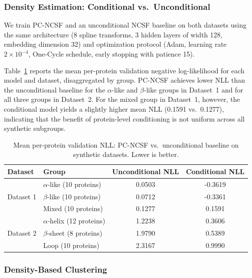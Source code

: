 \documentclass{article}
\begin{document}
\subsubsection{Density Estimation: Conditional vs.\ Unconditional}
\label{sec:sim_nll}

We train PC-NCSF and an unconditional NCSF baseline on both datasets
using the same architecture (8 spline transforms, 3 hidden layers of width 128,
embedding dimension 32) and optimization protocol (Adam, learning rate
$2 \times 10^{-4}$, One-Cycle schedule, early stopping with patience 15).

{\color{red}
Table~\ref{tab:sim_nll} reports the mean per-protein validation
negative log-likelihood for each model and dataset, disaggregated by group.
PC-NCSF achieves lower NLL than the unconditional baseline for the
$\alpha$-like and $\beta$-like groups in Dataset~1 and for all three groups
in Dataset~2. For the mixed group in Dataset~1, however, the conditional
model yields a slightly higher mean NLL (0.1591 vs.\ 0.1277), indicating
that the benefit of protein-level conditioning is not uniform across all
synthetic subgroups.
}
\begin{table}[t]
\centering
\caption{Mean per-protein validation NLL: PC-NCSF vs.\ unconditional baseline
on synthetic datasets.
Lower is better.}
\label{tab:sim_nll}
\begin{tabular}{llcc}
\toprule
Dataset & Group & Unconditional NLL & Conditional NLL \\
\midrule
\multirow{3}{*}{Dataset 1}
& $\alpha$-like (10 proteins) & 0.0503
& -0.3619\\
& $\beta$-like (10 proteins) & 0.0712 & -0.3361 \\
& Mixed (10 proteins) & 0.1277 & 0.1591 \\
\midrule
\multirow{3}{*}{Dataset 2}
& $\alpha$-helix (12 proteins) & 1.2238
& 0.3606 \\
& $\beta$-sheet (8 proteins) & 1.9790 & 0.5389 \\
& Loop (10 proteins) & 2.3167 & 0.9990 \\
\bottomrule
\end{tabular}
\end{table}
\subsubsection{Density-Based Clustering}
\label{sec:sim_clustering}
\end{document}
